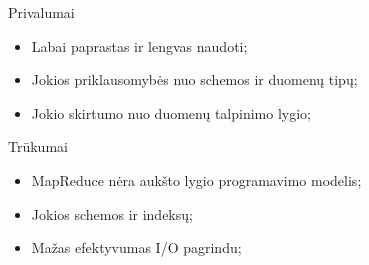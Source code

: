 \documentclass{beamer}
\begin{document}
  \begin{frame}{Privalumai}
    \begin{itemize}
      \item Labai paprastas ir lengvas naudoti;
      \item Jokios priklausomybės nuo schemos ir duomenų tipų;
      \item Jokio skirtumo nuo duomenų talpinimo lygio;
    \end{itemize}
  \end{frame}

  \begin{frame}{Trūkumai}
    \begin{itemize}
      \item MapReduce nėra aukšto lygio programavimo modelis;
      \item Jokios schemos ir indeksų;
      \item Mažas efektyvumas I/O pagrindu;
    \end{itemize}
  \end{frame}
\end{document}
